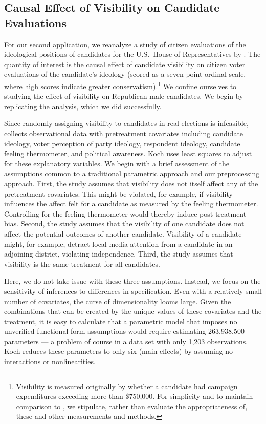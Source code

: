 \documentclass[11pt,titlepage]{article}
\begin{document}
\subsection{Causal Effect of Visibility on Candidate
  Evaluations}

For our second application, we reanalyze a study of citizen
evaluations of the ideological positions of candidates for the U.S.\ 
House of Representatives by \citet{Koch02}.  The quantity of interest
is the causal effect of candidate visibility on citizen voter
evaluations of the candidate's ideology (scored as a seven point
ordinal scale, where high scores indicate greater
conservatism).\footnote{Visibility is measured originally by whether a
  candidate had campaign expenditures exceeding more than \$750,000.
  For simplicity and to maintain comparison to \citet{Koch02}, we
  stipulate, rather than evaluate the appropriateness of, these and
  other measurements and methods.}  We confine ourselves to studying
the effect of visibility on Republican male candidates.  We begin by
replicating the analysis, which we did successfully.

Since randomly assigning visibility to candidates in real elections is
infeasible, \citet{Koch02} collects observational data with
pretreatment covariates including candidate ideology, voter perception
of party ideology, respondent ideology, candidate feeling thermometer,
and political awareness.  Koch uses least squares to adjust for these
explanatory variables.  We begin with a brief assessment of the
assumptions common to a traditional parametric approach and our
preprocessing approach.  First, the study assumes that visibility does
not itself affect any of the pretreatment covariates.  This might be
violated, for example, if visibility influences the affect felt for a
candidate as measured by the feeling thermometer.  Controlling for the
feeling thermometer would thereby induce post-treatment bias.  Second,
the study assumes that the visibility of one candidate does not affect
the potential outcomes of another candidate.  Visibility of a
candidate might, for example, detract local media attention from a
candidate in an adjoining district, violating independence.  Third,
the study assumes that visibility is the same treatment for all
candidates.

Here, we do not take issue with these three assumptions.  Instead, we
focus on the sensitivity of inferences to differences in
specification.  Even with a relatively small number of covariates, the
curse of dimensionality looms large.  Given the combinations that can
be created by the unique values of these covariates and the treatment,
it is easy to calculate that a parametric model that imposes no
unverified functional form assumptions would require estimating
263,938,500 parameters --- a problem of course in a data set with only
1,203 observations.  Koch reduces these parameters to only six (main
effects) by assuming no interactions or nonlinearities.
\end{document}
